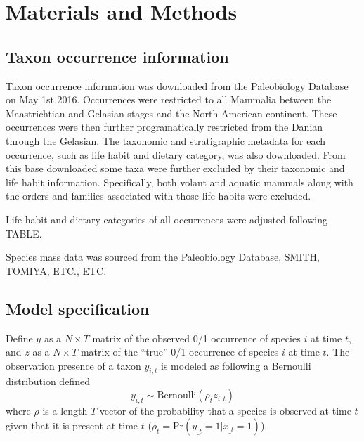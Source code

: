 \documentclass[12pt,letterpaper]{article}
\begin{document}
\section*{Materials and Methods}

\subsection*{Taxon occurrence information}

Taxon occurrence information was downloaded from the Paleobiology Database on May 1st 2016. Occurrences were restricted to all Mammalia between the Maastrichtian and Gelasian stages and  the North American continent. These occurrences were then further programatically restricted from the Danian through the Gelasian. The taxonomic and stratigraphic metadata for each occurrence, such as life habit and dietary category, was also downloaded. From this base downloaded some taxa were further excluded by their taxonomic and life habit information. Specifically, both volant and aquatic mammals along with the orders and families associated with those life habits were excluded. 


Life habit and dietary categories of all occurrences were adjusted following TABLE. 

Species mass data was sourced from the Paleobiology Database, SMITH, TOMIYA, ETC., ETC.




\subsection*{Model specification}


Define \(y\) as a \(N \times T\) matrix of the observed 0/1 occurrence of species \(i\) at time \(t\), and \(z\) as a \(N \times T\) matrix of the ``true'' 0/1 occurrence of species \(i\) at time \(t\). The observation presence of a taxon \(y_{i,t}\) is modeled as following a Bernoulli distribution defined
\begin{equation}
  y_{i,t} \sim \text{Bernoulli}(\rho_{t} z_{i,t})
  \label{eq:latent}
\end{equation}
where \(\rho\) is a length \(T\) vector of the probability that a species is observed at time \(t\) given that it is present at time \(t\) (\(\rho_{t} = \text{Pr}(y_{\_t} = 1 | x_{\_t} = 1)\)).
\end{document}
